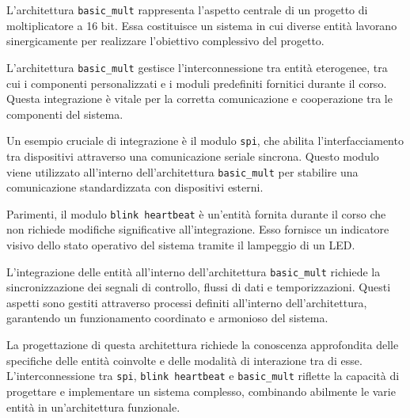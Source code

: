 \documentclass[titlepage]{report}
\begin{document}
		L'architettura \texttt{basic\_mult} rappresenta l'aspetto centrale di un progetto di moltiplicatore a 16 bit. Essa costituisce un sistema in cui diverse entità lavorano sinergicamente per realizzare l'obiettivo complessivo del progetto.

		L'architettura \texttt{basic\_mult} gestisce l'interconnessione tra entità eterogenee, tra cui i componenti personalizzati e i moduli predefiniti fornitici durante il corso. Questa integrazione è vitale per la corretta comunicazione e cooperazione tra le componenti del sistema.

		Un esempio cruciale di integrazione è il modulo \texttt{spi}, che abilita l'interfacciamento tra dispositivi attraverso una comunicazione seriale sincrona. Questo modulo viene utilizzato all'interno dell'architettura \texttt{basic\_mult} per stabilire una comunicazione standardizzata con dispositivi esterni.

		Parimenti, il modulo \texttt{blink heartbeat} è un'entità fornita durante il corso che non richiede modifiche significative all'integrazione. Esso fornisce un indicatore visivo dello stato operativo del sistema tramite il lampeggio di un LED.

		L'integrazione delle entità all'interno dell'architettura \texttt{basic\_mult} richiede la sincronizzazione dei segnali di controllo, flussi di dati e temporizzazioni. Questi aspetti sono gestiti attraverso processi definiti all'interno dell'architettura, garantendo un funzionamento coordinato e armonioso del sistema.

		La progettazione di questa architettura richiede la conoscenza approfondita delle specifiche delle entità coinvolte e delle modalità di interazione tra di esse. L'interconnessione tra \texttt{spi}, \texttt{blink heartbeat} e \texttt{basic\_mult} riflette la capacità di progettare e implementare un sistema complesso, combinando abilmente le varie entità in un'architettura funzionale.
\end{document}
